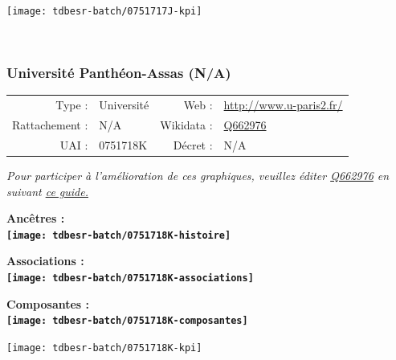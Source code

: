 \documentclass[12pt,french,]{article}
\begin{document}
\begin{center}\texttt{[image: tdbesr-batch/0751717J-kpi]} \end{center}\checkoddpage

\ifoddpage \fi ~\newpage  

\hypertarget{universituxe9-panthuxe9on-assas-na}{%
\subsubsection{Université Panthéon-Assas
(N/A)}\label{universituxe9-panthuxe9on-assas-na}}

\begin{tabular*}{\textwidth}{rp{5cm}rl}  
\hline  
Type : & Université & Web : &\href{http://www.u-paris2.fr/}{http://www.u-paris2.fr/} \\  
Rattachement : & N/A & Wikidata : & \href{https://www.wikidata.org/entity/Q662976}{Q662976} \\  
UAI : & 0751718K & Décret : & N/A \\  
\hline  
\end{tabular*}

\textit{\scriptsize Pour participer à l'amélioration de ces graphiques, veuillez éditer  \href{https://www.wikidata.org/entity/Q662976}{Q662976}  en suivant \href{https://github.com/cpesr/wikidataESR/blob/master/Rmd/wikidataESR.md}{ce guide.}}

\vspace{1cm}  
\begin{minipage}[b]{0.50\textwidth}\begin{center} \bf Ancêtres : \\  
\texttt{[image: tdbesr-batch/0751718K-histoire]} \end{center}\end{minipage}\begin{minipage}[b]{0.50\textwidth}\begin{center} \bf Associations : \\  
\texttt{[image: tdbesr-batch/0751718K-associations]} \end{center}\end{minipage}

\hrulefill

\begin{center} \bf Composantes : \\  
\texttt{[image: tdbesr-batch/0751718K-composantes]} \end{center}

\begin{center}\texttt{[image: tdbesr-batch/0751718K-kpi]} \end{center}\checkoddpage
\end{document}
